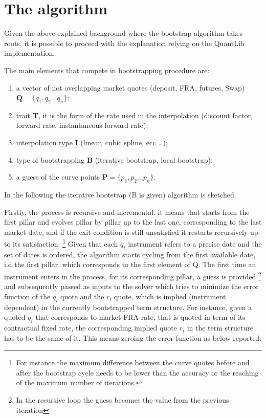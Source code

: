 \section{The algorithm}

Given the above explained background where the bootstrap algorithm takes roots, it is possible to proceed with the explanation relying on the QuantLib implementation.

The main elements that compete in bootstrapping procedure are:

\begin{enumerate}
    \item a vector of not overlapping market quotes (deposit, FRA, futures, Swap) $\textbf{Q} =\{q_{1},q_{2}\dots q_{n}\}$;
    \item trait \textbf{T}, it is the form of the rate used in the interpolation (discount factor, forward rate, instantaneous forward rate);
    \item interpolation type \textbf{I} (linear, cubic spline, ecc \dots);
    \item type of bootstrapping \textbf{B} (iterative bootstrap, local bootstrap);
    \item a guess of the curve points $\textbf{P} =\{p_{1},p_{2}\dots p_{n}\}$.
\end{enumerate}

In the following the iterative bootstrap (B is given) algorithm is sketched.

Firstly, the process is recursive and incremental: it means that starts from the first pillar and evolves pillar by pillar up to the last one, corresponding to the last market date, and if the exit condition is still unsatisfied it restarts recursively up to its satisfaction. \footnote{For instance the maximum difference between the curve quotes before and after the bootstrap cycle needs to be lower than the accuracy or the reaching of the maximum number of iterations.}
Given that each $q_{i}$ instrument refers to a precise date and the set of dates is ordered, the algorithm starts cycling from the first available date, i.d the first pillar, which corresponds to the first element of Q. 
The first time an instrument enters in the process, for its corresponding pillar, a guess is provided \footnote{In the recursive loop the guess becomes the value from the previous iteration} and subsequently passed as inputs to the solver which tries to minimize the error function of the $q_{i}$ quote and the $r_{i}$ quote, which is implied (instrument dependent) in the currently bootstrapped term structure. 
For instance, given a quoted $q_{i}$ that corresponds to market FRA rate, that is quoted in term of its contractual fixed rate, the corresponding implied quote $r_{i}$ in the term structure has to be the same of it. This means zeroing the error function as below reported:

